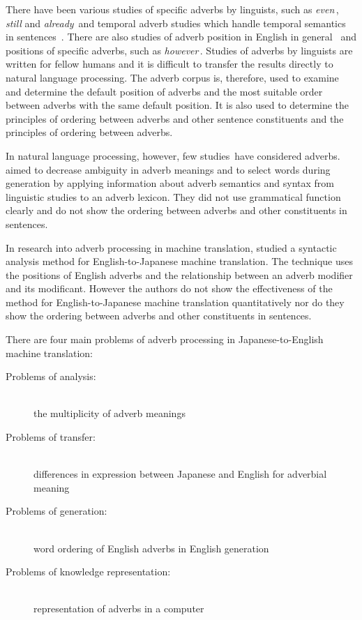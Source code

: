 There have been various studies of specific adverbs by linguists, such
as {\em even}\/\,\cite{Berckmans:93}, {\em still} and {\em
  already}\/\,\cite{vanderAuwera:93} and temporal adverb studies which
handle temporal semantics in sentences~\cite{Vlach:93}.  There are
also studies of adverb position in English in general~\cite{Ernst:84}
and positions of specific adverbs, such as {\em
  however}\/\,\cite{Sugiura:91}.
Studies of adverbs by linguists are written for fellow humans and  it
is difficult to transfer the results directly to natural language
processing. The adverb corpus is, therefore, used to examine and determine
the default position of adverbs and the most suitable order between adverbs 
with the same default position.   It is also used to determine the
principles of ordering between adverbs and other sentence constituents
and the principles of ordering between adverbs.

In natural language processing, however, few
studies\,\cite{Conlon:92,Glasbey:93} have considered adverbs.
 aimed to decrease ambiguity in adverb meanings and
to select words during generation by applying information about adverb
semantics and syntax from linguistic studies to an adverb lexicon.
They did not use grammatical function clearly and do not show the
ordering between adverbs and other constituents in sentences.

  In research into adverb processing in machine translation, 
 studied a syntactic analysis method for English-to-Japanese 
machine translation.
The technique uses the positions of English adverbs and the
relationship between an adverb modifier and its modificant.
However the authors do not show the effectiveness of the method for
English-to-Japanese machine translation quantitatively 
nor do they show the ordering between adverbs and 
other constituents in sentences.

There are four main problems of adverb processing in Japanese-to-English 
machine translation:

\begin{description}
  \item [Problems of analysis:] \mbox{}\\
    the multiplicity of adverb meanings 
  \item [Problems of transfer:]  \mbox{}\\
    differences in expression between Japanese and English for adverbial 
        meaning
  \item [Problems of generation:]  \mbox{}\\
    word ordering of English adverbs in English generation 
  \item [Problems of knowledge representation:] \mbox{}\\ 
    representation of adverbs in a
    computer\,\cite{Ogura:92,Shimazu:83,Iida:83,Moore:93}
   \vspace*{2mm}
\end{description}

